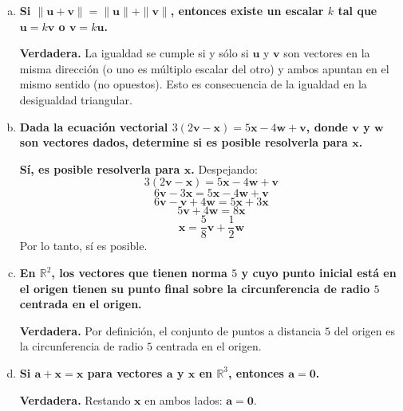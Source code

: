 \begin{prob}
\begin{myproof}
\begin{enumerate}[a)]
\item \textbf{Si $\|\mathbf{u}+\mathbf{v}\|=\|\mathbf{u}\|+\|\mathbf{v}\|$, entonces existe un escalar $k$ tal que $\mathbf{u}=k\mathbf{v}$ o $\mathbf{v}=k\mathbf{u}$.}

\textbf{Verdadera.}  
La igualdad se cumple si y sólo si $\mathbf{u}$ y $\mathbf{v}$ son vectores en la misma dirección (o uno es múltiplo escalar del otro) y ambos apuntan en el mismo sentido (no opuestos).  
Esto es consecuencia de la igualdad en la desigualdad triangular.

\vspace{1em}

\item \textbf{Dada la ecuación vectorial $3(2\mathbf{v}-\mathbf{x})=5\mathbf{x}-4\mathbf{w}+\mathbf{v}$, donde $\mathbf{v}$ y $\mathbf{w}$ son vectores dados, determine si es posible resolverla para $\mathbf{x}$.}

\textbf{Sí, es posible resolverla para $\mathbf{x}$.}  
Despejando:
\[
3(2\mathbf{v}-\mathbf{x}) = 5\mathbf{x} - 4\mathbf{w} + \mathbf{v}
\]
\[
6\mathbf{v} - 3\mathbf{x} = 5\mathbf{x} - 4\mathbf{w} + \mathbf{v}
\]
\[
6\mathbf{v} - \mathbf{v} + 4\mathbf{w} = 5\mathbf{x} + 3\mathbf{x}
\]
\[
5\mathbf{v} + 4\mathbf{w} = 8\mathbf{x}
\]
\[
\mathbf{x} = \frac{5}{8}\mathbf{v} + \frac{1}{2}\mathbf{w}
\]
Por lo tanto, sí es posible.

\vspace{1em}

\item \textbf{En $\mathbb{R}^2$, los vectores que tienen norma $5$ y cuyo punto inicial está en el origen tienen su punto final sobre la circunferencia de radio $5$ centrada en el origen.}

\textbf{Verdadera.}  
Por definición, el conjunto de puntos a distancia $5$ del origen es la circunferencia de radio $5$ centrada en el origen.

\vspace{1em}

\item \textbf{Si $\mathbf{a}+\mathbf{x}=\mathbf{x}$ para vectores $\mathbf{a}$ y $\mathbf{x}$ en $\mathbb{R}^3$, entonces $\mathbf{a}=\mathbf{0}$.}

\textbf{Verdadera.}  
Restando $\mathbf{x}$ en ambos lados: $\mathbf{a} = \mathbf{0}$.
\end{enumerate}
\end{myproof}

\end{prob}

